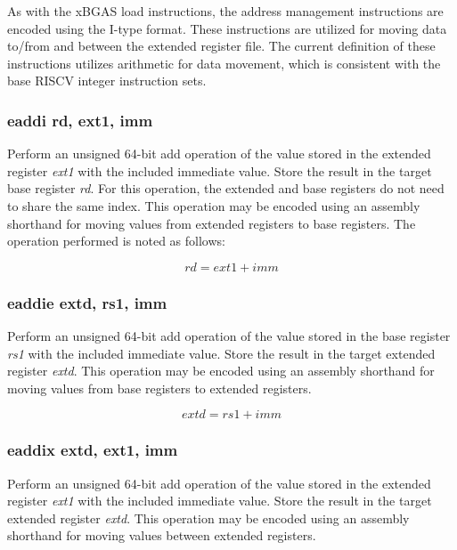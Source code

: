 \documentclass{article}
\begin{document}
As with the xBGAS load instructions, the address management instructions 
are encoded using the I-type format.  These instructions are utilized for 
moving data to/from and between the extended register file.  The current 
definition of these instructions utilizes arithmetic for data movement, 
which is consistent with the base RISCV integer instruction sets.

\subsubsection{eaddi rd, ext1, imm}

Perform an unsigned 64-bit add operation of the value stored in the extended 
register \textit{ext1} with the included immediate value.  Store the result 
in the target base register \textit{rd}.  For this operation, the extended and base registers 
do not need to share the same index.  This operation may be encoded 
using an assembly shorthand for moving values from extended registers 
to base registers.  The operation performed is noted as follows:

\begin{equation}
rd = ext1 + imm
\end{equation}

\subsubsection{eaddie extd, rs1, imm}

Perform an unsigned 64-bit add operation of the value stored in the base 
register \textit{rs1} with the included immediate value.  Store the result in the 
target extended register \textit{extd}.  This operation may be encoded 
using an assembly shorthand for moving values from base registers 
to extended registers.

\begin{equation}
extd = rs1 + imm
\end{equation}

\subsubsection{eaddix extd, ext1, imm}

Perform an unsigned 64-bit add operation of the value stored in the extended
register \textit{ext1} with the included immediate value.  Store the result in the 
target extended register \textit{extd}.  This operation may be encoded using 
an assembly shorthand for moving values between extended registers.  
\end{document}
